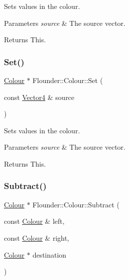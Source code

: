 Sets values in the colour. 


\begin{DoxyParams}{Parameters}
{\em source} & The source vector. \\
\hline
\end{DoxyParams}
\begin{DoxyReturn}{Returns}
This. 
\end{DoxyReturn}
\mbox{\label{class_flounder_1_1_colour_abfe987ab057d8c17cd9d18613fcee303}} 
\subsubsection{\texorpdfstring{Set()}{Set()}\hspace{0.1cm}{\footnotesize\ttfamily [5/5]}}
{\footnotesize\ttfamily \hyperlink{class_flounder_1_1_colour}{Colour} $\ast$ Flounder\+::\+Colour\+::\+Set (\begin{DoxyParamCaption}\item[{const \hyperlink{class_flounder_1_1_vector4}{Vector4} \&}]{source }\end{DoxyParamCaption})}



Sets values in the colour. 


\begin{DoxyParams}{Parameters}
{\em source} & The source vector. \\
\hline
\end{DoxyParams}
\begin{DoxyReturn}{Returns}
This. 
\end{DoxyReturn}
\mbox{\label{class_flounder_1_1_colour_adac2e9bb9d28cc0bff1cd9de3ac6180a}} 
\subsubsection{\texorpdfstring{Subtract()}{Subtract()}}
{\footnotesize\ttfamily \hyperlink{class_flounder_1_1_colour}{Colour} $\ast$ Flounder\+::\+Colour\+::\+Subtract (\begin{DoxyParamCaption}\item[{const \hyperlink{class_flounder_1_1_colour}{Colour} \&}]{left,  }\item[{const \hyperlink{class_flounder_1_1_colour}{Colour} \&}]{right,  }\item[{\hyperlink{class_flounder_1_1_colour}{Colour} $\ast$}]{destination }\end{DoxyParamCaption})\hspace{0.3cm}{\ttfamily [static]}}




